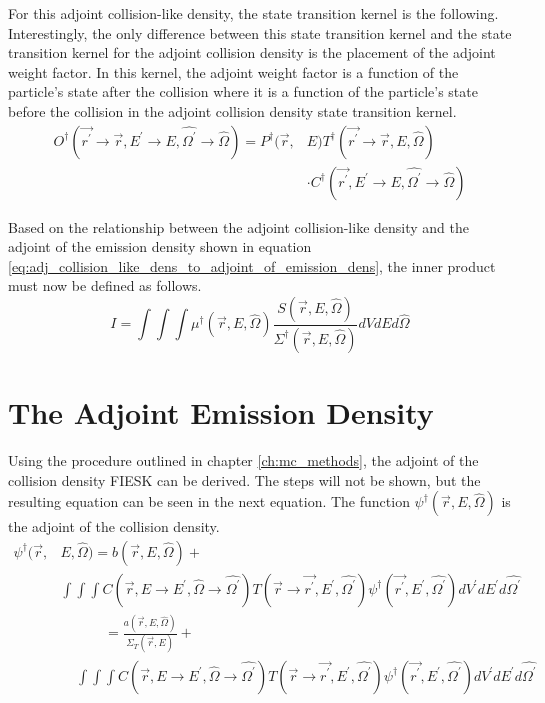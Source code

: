 For this adjoint collision-like density, the state transition kernel is the 
following. Interestingly, the only difference between this state transition
kernel and the state transition kernel for the adjoint collision density is
the placement of the adjoint weight factor. In this kernel, the adjoint
weight factor is a function of the particle's state after the collision where
it is a function of the particle's state before the collision in the adjoint
collision density state transition kernel.
\begin{equation}
  \begin{split}
    O^{\dagger}(\vec{r^{'}} \to \vec{r},E^{'} \to E,\hat{\Omega^{'}} \to \hat{\Omega})
    = P^{\dagger}(\vec{r},&E) 
    T^{\dagger}(\vec{r^{'}} \to \vec{r},E,\hat{\Omega}) \\
    & \cdot C^{\dagger}(\vec{r^{'}},E^{'} \to E,\hat{\Omega^{'}} \to \hat{\Omega})
  \end{split}
\end{equation}

Based on the relationship between the adjoint collision-like density and the
adjoint of the emission density shown in equation 
\ref{eq:adj_collision_like_dens_to_adjoint_of_emission_dens}, the inner product
must now be defined as follows.
\begin{equation}
  I = \int\int\int \mu^{\dagger}(\vec{r},E,\hat{\Omega})
  \frac{S(\vec{r},E,\hat{\Omega})}{\Sigma^{\dagger}(\vec{r},E,\hat{\Omega})}
  dV dE d\hat{\Omega}
\end{equation}

\section{The Adjoint Emission Density}
Using the procedure outlined in chapter \ref{ch:mc_methods}, the adjoint of the
collision density FIESK can be derived. The steps will not be shown, but the 
resulting equation can be seen in the next equation. The function 
$\psi^{\dagger}(\vec{r},E,\hat{\Omega})$ is the adjoint of the collision density.
\begin{equation*}
  \begin{split}
    \psi^{\dagger}(\vec{r},&E,\hat{\Omega}) = b(\vec{r},E,\hat{\Omega}) + \\
    & \int\int\int C(\vec{r},E \to E^{'},\hat{\Omega} \to \hat{\Omega^{'}})
    T(\vec{r} \to \vec{r^{'}},E^{'},\hat{\Omega^{'}})
    \psi^{\dagger}(\vec{r^{'}},E^{'},\hat{\Omega^{'}}) dV^{'}dE^{'}d\hat{\Omega^{'}}
  \end{split}
\end{equation*}
\begin{equation}
  \begin{split}
    \qquad \quad \text{  } & \qquad = \frac{a(\vec{r},E,\hat{\Omega})}
    {\Sigma_T(\vec{r},E)}+ \\
    & \int\int\int C(\vec{r},E \to E^{'},\hat{\Omega} \to \hat{\Omega^{'}})
    T(\vec{r} \to \vec{r^{'}},E^{'},\hat{\Omega^{'}})
    \psi^{\dagger}(\vec{r^{'}},E^{'},\hat{\Omega^{'}}) dV^{'}dE^{'}d\hat{\Omega^{'}}
  \end{split}
\end{equation}

